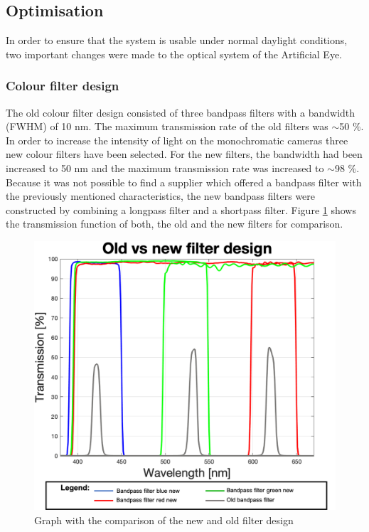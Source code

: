 \subsection{Optimisation}
In order to ensure that the system is usable under normal daylight conditions, two important changes were made to the optical system of the Artificial Eye. 
\subsubsection{Colour filter design}
The old colour filter design consisted of three bandpass filters with a bandwidth (FWHM) of 10 nm. The maximum transmission rate of the old filters was $\sim$50 \%. In order to increase the intensity of light on the monochromatic cameras three new colour filters have been selected. For the new filters, the bandwidth had been increased to 50 nm and the maximum transmission rate was increased to $\sim$98 \%. Because it was not possible to find a supplier which offered a bandpass filter with the previously mentioned characteristics, the new bandpass filters were constructed by combining a longpass filter and a shortpass filter. Figure \ref{FilterComp} shows the transmission function of both, the old and the new filters for comparison.

\begin{figure}
\begin{center}
\includegraphics[width=12cm]{Pictures/AMOLEDSpectrumFilter}
\caption[Graph with the comparison of the new and old filter design]{Graph with the comparison of the new and old filter design}
\label{FilterComp}
\end{center}
\end{figure}

